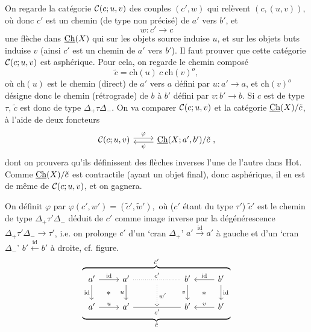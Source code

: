 On regarde la catégorie $\mathcal{C}(c;u,v)$ des couples $(c',w)$ qui relèvent $(c,(u,v))$, où donc $c'$ est un chemin (de type non précisé) de $a'$ vers $b'$, et
\[
w : c' \longrightarrow c
\]
une flèche dans $\underline{\mathrm{Ch}}(X)$ qui sur les objets source induise $u$, et sur les objets buts induise $v$ (ainsi $c'$ est un chemin de $a'$ vers $b'$). Il faut
prouver que cette catégorie $\mathcal{C}(c;u,v)$ est asphérique. Pour cela, on regarde le chemin composé
\[
\tilde{c} = \mathrm{ch}(u)\ c\ \mathrm{ch}(v)^{o},
\]
où $\mathrm{ch}(u)$ est le chemin (direct) de $a'$ vers $a$ défini par $u : a' \longrightarrow a$, et $\mathrm{ch}(v)^{o}$ désigne donc le chemin (rétrograde) de $b$ à $b'$ défini par $v : b' \longrightarrow b$. Si $c$ est de type $\tau$, $\tilde{c}$ est donc de type $\Delta_{+}\tau\Delta_{-}$. On va comparer $\mathcal{C}(c;u,v)$ et la catégorie $\underline{\mathrm{Ch}}(X)/\tilde{c}$, à l'aide de deux foncteurs
\[
\begin{tikzcd}
\cC(c;u,v) \ar[r,shift left,"\varphi"] & \Ch(X;a',b')/\tilde{c}\ , \ar[l,shift left,"\psi"]
\end{tikzcd}
\]
dont on prouvera qu'ils définissent des flèches inverses l'une de l'autre dans Hot. Comme $\underline{\mathrm{Ch}}(X)/\tilde{c}$ est contractile (ayant un objet final), donc asphérique, il en est de même de $\mathcal{C}(c;u,v)$, et on gagnera.

On définit $\varphi$ par $\boxed{\varphi(c',w') = (\tilde{c}',\tilde{w}'),}$ où ($c'$ étant du type $\tau'$) $\tilde{c}'$ est le chemin de type $\Delta_{+}\tau'\Delta_{-}$ déduit de $c'$ comme image inverse par la dégénérescence $\Delta_{+}\tau'\Delta_{-} \longrightarrow \tau'$, i.e. on prolonge $c'$ d'un `cran $\Delta_{+}$' $a' \xrightarrow{\mathrm{id}} a'$ à gauche et d'un `cran $\Delta_{-}$' $b' \xleftarrow{\mathrm{id}} b'$ à droite, cf. figure.
\[
\overbrace{\underbrace{\begin{tikzcd}[ampersand replacement=\&]
a' \ar[r,"\mathrm{id}"] \ar[d,"\mathrm{id}"'] \ar[dr,phantom,"\ast"] \& a' \ar[rr,dotted,no head,"c'"] \ar[d,"u"'] \& {} \ar[d,dotted,"w'"] \& b' \ar[d,"v"'] \ar[dr,phantom,"\ast"] \& b' \ar[l,"\mathrm{id}"'] \ar[d,"\mathrm{id}"] \\
a' \ar[r,"u"] \& a' \ar[rr,no head,"c'"'] \& {} \& b' \& b' \ar[l,"v"'] %
\end{tikzcd}}_{\tilde{c}}}^{\tilde{c}'}
\]

